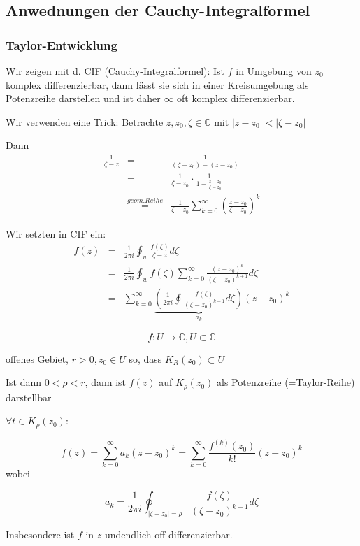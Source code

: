 \documentclass[10pt,a4paper]{article}
\begin{document}
\subsection{Anwednungen der Cauchy-Integralformel}

\subsubsection{Taylor-Entwicklung}

Wir zeigen mit d. CIF (Cauchy-Integralformel): Ist $f$ in Umgebung von $z_0$ komplex differenzierbar, dann lässt sie sich in einer Kreisumgebung als Potenzreihe darstellen und ist daher $\infty$ oft komplex differenzierbar.

Wir verwenden eine Trick: Betrachte $z,z_0, \zeta \in \mathbb{C}$ mit $|z-z_0|<|\zeta-z_0|$

Dann 
\begin{eqnarray*}
\frac{1}{\zeta-z} &=& \frac{1}{(\zeta - z_0)-(z-z_0)} \\
&=& \frac{1}{\zeta - z_0} \cdot \frac{1}{1-\frac{z-z_0}{\zeta-z_0}} \\
&\stackrel{geom. Reihe}{=}& \frac{1}{\zeta-z_0} \sum_{k=0}^{\infty} \left( \frac{z-z_0}{\zeta-z_0} \right)^{k}
\end{eqnarray*}





Wir setzten in CIF ein: 
\begin{eqnarray*}
f(z)&=&\frac{1}{2 \pi i} \oint_w \frac{f(\zeta)}{\zeta-z} d\zeta \\
&=& \frac{1}{2 \pi i} \oint_w f(\zeta) \sum_{k=0}^{\infty} \frac{(z-z_0)^{k}}{(\zeta-z_0)^{k+1}} d\zeta \\
&=& \sum_{k=0}^{\infty} \underbrace{\left( \frac{1}{2 \pi i} \oint \frac{f(\zeta)}{(\zeta-z_0)^{k+1}} d\zeta \right)}_{a_k}(z-z_0)^{k}
\end{eqnarray*}




\begin{satz}


$$f:U \rightarrow \mathbb{C}, U \subset \mathbb{C}$$

offenes Gebiet, $r >0 , z_0 \in U$ so, dass $K_R(z_0) \subset U$

Ist dann $0 < \rho < r$, dann ist $f(z)$ auf $K_\rho(z_0)$ als Potenzreihe (=Taylor-Reihe) darstellbar

$\forall t \in K_\rho(z_0)$:

$$f(z)=\sum_{k=0}^{\infty} a_k (z-z_0)^{k} = \sum_{k=0}^{\infty} \frac{f^{(k)}(z_0)}{k!}(z-z_0)^{k}$$ wobei

$$a_k=\frac{
1}{2 \pi i} \oint_{|\zeta-z_0|=\rho} \frac{f(\zeta)}{(\zeta-z_0)^{k+1}} d \zeta$$

Insbesondere ist $f$ in $z$ undendlich off differenzierbar.



\end{satz}
\end{document}
